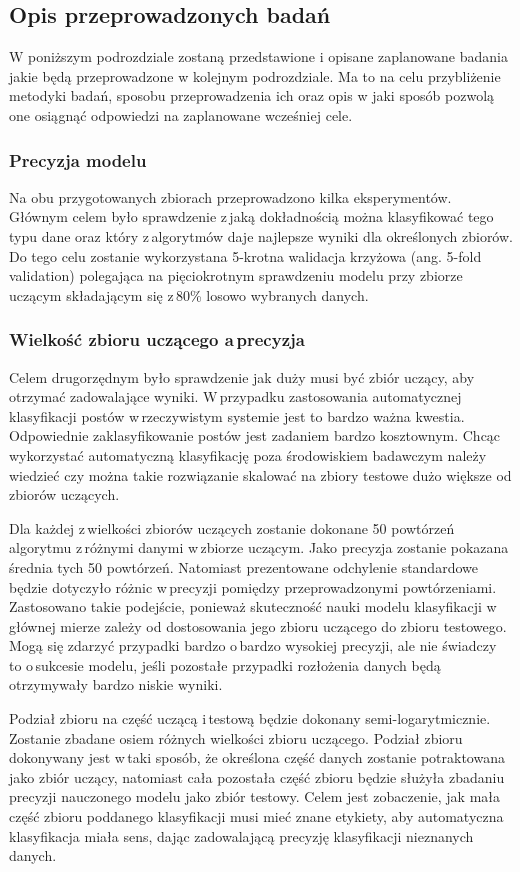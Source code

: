 \subsection{Opis przeprowadzonych badań}
W poniższym podrozdziale zostaną przedstawione i opisane zaplanowane badania jakie będą przeprowadzone w kolejnym podrozdziale. Ma to na celu przybliżenie metodyki badań, sposobu przeprowadzenia ich oraz opis w jaki sposób pozwolą one osiągnąć odpowiedzi na zaplanowane wcześniej cele.
\subsubsection{Precyzja modelu}
Na obu przygotowanych zbiorach przeprowadzono kilka eksperymentów. Głównym celem było sprawdzenie z\,jaką dokładnością można klasyfikować tego typu dane oraz który z\,algorytmów daje najlepsze wyniki dla określonych zbiorów. Do tego celu zostanie wykorzystana 5-krotna walidacja krzyżowa (ang. 5-fold validation) polegająca na pięciokrotnym sprawdzeniu modelu przy zbiorze uczącym składającym się z\,80\% losowo wybranych danych. 
\subsubsection{Wielkość zbioru uczącego a\,precyzja}
Celem drugorzędnym było sprawdzenie jak duży musi być zbiór uczący, aby otrzymać zadowalające wyniki. W\,przypadku zastosowania automatycznej klasyfikacji postów w\,rzeczywistym systemie jest to bardzo ważna kwestia. Odpowiednie zaklasyfikowanie postów jest zadaniem bardzo kosztownym. Chcąc wykorzystać automatyczną klasyfikację poza środowiskiem badawczym należy wiedzieć czy można takie rozwiązanie skalować na zbiory testowe dużo większe od zbiorów uczących. 
\par
Dla każdej z\,wielkości zbiorów uczących zostanie dokonane 50 powtórzeń algorytmu z\,różnymi danymi w\,zbiorze uczącym. Jako precyzja zostanie pokazana średnia tych 50 powtórzeń. Natomiast prezentowane odchylenie standardowe będzie dotyczyło różnic w\,precyzji pomiędzy przeprowadzonymi powtórzeniami. Zastosowano takie podejście, ponieważ skuteczność nauki modelu klasyfikacji w\,głównej mierze zależy od dostosowania jego zbioru uczącego do zbioru testowego. Mogą się zdarzyć przypadki bardzo o\,bardzo wysokiej precyzji, ale nie świadczy to o\,sukcesie modelu, jeśli pozostałe przypadki rozłożenia danych będą otrzymywały bardzo niskie wyniki.
\par
Podział zbioru na część uczącą i\,testową będzie dokonany semi-logarytmicznie. Zostanie zbadane osiem różnych wielkości zbioru uczącego.  Podział zbioru dokonywany jest w\,taki sposób, że określona część danych zostanie potraktowana jako zbiór uczący, natomiast cała pozostała część zbioru będzie służyła zbadaniu precyzji nauczonego modelu jako zbiór testowy. Celem jest zobaczenie, jak mała część zbioru poddanego klasyfikacji musi mieć znane etykiety, aby automatyczna klasyfikacja miała sens, dając zadowalającą precyzję klasyfikacji nieznanych danych.

